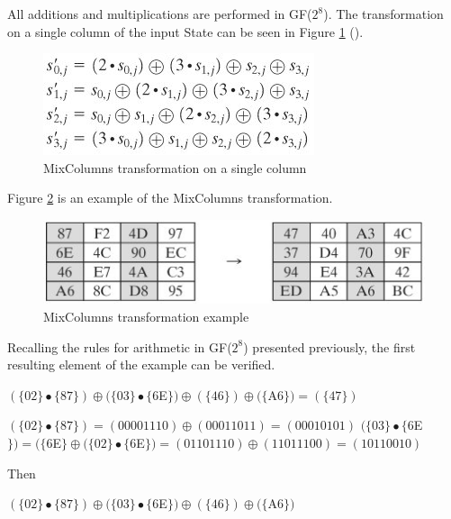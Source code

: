 \documentclass[a4paper,12pt]{report}
\begin{document}
All additions and multiplications are performed in GF($2^{8}$). The transformation on a single column of the input State can be seen in Figure \ref{fig:mixcols2} (\cite{aesmixcolssecond}).

\begin{figure}[htb]
\centering
\includegraphics[scale=0.7]{images/mixcols2.jpg}
\caption{MixColumns transformation on a single column}
\label{fig:mixcols2}
\end{figure}

Figure \ref{fig:mixcolsexample} is an example of the MixColumns transformation.

\begin{figure}[!ht]
\centering
\includegraphics[scale=0.7]{images/mixcolsexample.jpg}
\caption{MixColumns transformation example}
\label{fig:mixcolsexample}
\end{figure}

Recalling the rules for arithmetic in GF($2^{8}$) presented previously, the first resulting element of the example can be verified. 

\begin{center}

$ (\{02\}\bullet \{87\}) \oplus (\{03\} \bullet \{6$E$\}) \oplus (\{46\}) \oplus (\{$A$6\}) = (\{47\}) $
\end{center}
\begin{center}
$ (\{02\}\bullet \{87\}) = (00001110) \oplus (00011011) = (00010101) $
$ (\{03\} \bullet \{6$E$\}) = (\{6$E$\} \oplus (\{02\} \bullet \{6$E$\}) = (01101110) \oplus (11011100) = (10110010) $
\end{center}

Then 

\begin{center}
 $ (\{02\}\bullet \{87\}) \oplus (\{03\} \bullet \{6$E$\}) \oplus (\{46\}) \oplus (\{$A$6\}) $
\end{center}
\end{document}
